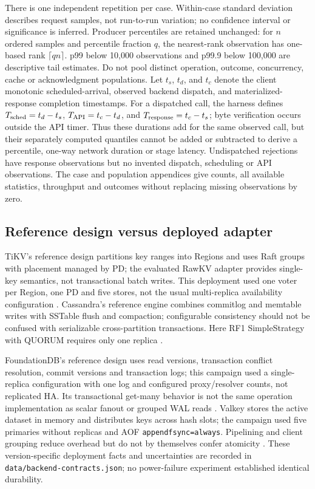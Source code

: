 \documentclass[11pt,a4paper]{article}
\begin{document}
There is one independent repetition per case. Within-case standard deviation describes request samples, not run-to-run variation; no confidence interval or significance is inferred. Producer percentiles are retained unchanged: for $n$ ordered samples and percentile fraction $q$, the nearest-rank observation has one-based rank $\lceil qn\rceil$. p99 below 10,000 observations and p99.9 below 100,000 are descriptive tail estimates. Do not pool distinct operation, outcome, concurrency, cache or acknowledgment populations. Let $t_s$, $t_d$, and $t_c$ denote the client monotonic scheduled-arrival, observed backend dispatch, and materialized-response completion timestamps. For a dispatched call, the harness defines $T_{\rm sched}=t_d-t_s$, $T_{\rm API}=t_c-t_d$, and $T_{\rm response}=t_c-t_s$; byte verification occurs outside the API timer. Thus these durations add for the same observed call, but their separately computed quantiles cannot be added or subtracted to derive a percentile, one-way network duration or stage latency. Undispatched rejections have response observations but no invented dispatch, scheduling or API observations. The case and population appendices give counts, all available statistics, throughput and outcomes without replacing missing observations by zero.

\subsection{Reference design versus deployed adapter}
TiKV's reference design partitions key ranges into Regions and uses Raft groups with placement managed by PD; the evaluated RawKV adapter provides single-key semantics, not transactional batch writes. This deployment used one voter per Region, one PD and five stores, not the usual multi-replica availability configuration \cite{tikvstorage,tikvwrite854}. Cassandra's reference engine combines commitlog and memtable writes with SSTable flush and compaction; configurable consistency should not be confused with serializable cross-partition transactions. Here RF1 SimpleStrategy with QUORUM requires only one replica \cite{cassandraengine,cassandraconfig509}.

FoundationDB's reference design uses read versions, transaction conflict resolution, commit versions and transaction logs; this campaign used a single-replica configuration with one log and configured proxy/resolver counts, not replicated HA. Its transactional get-many behavior is not the same operation implementation as scalar fanout or grouped WAL reads \cite{fdbarchitecture,fdbconfig7377}. Valkey stores the active dataset in memory and distributes keys across hash slots; the campaign used five primaries without replicas and AOF \texttt{appendfsync=always}. Pipelining and client grouping reduce overhead but do not by themselves confer atomicity \cite{valkeycluster,valkeypersistence,valkeypipeline}. These version-specific deployment facts and uncertainties are recorded in \texttt{data/backend-contracts.json}; no power-failure experiment established identical durability.
\end{document}
